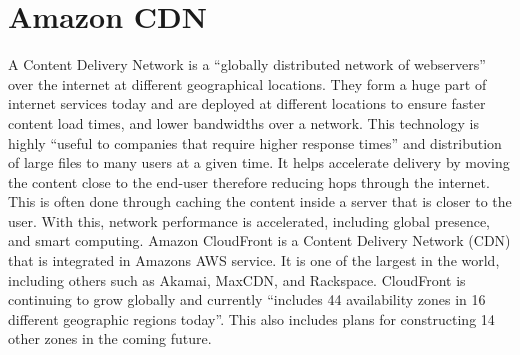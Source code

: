\section{Amazon CDN}

A Content Delivery Network is a “globally distributed network of webservers” \cite{Content-Delivery-Network} over the internet at different geographical locations. They form a huge part of internet services today and are deployed at different locations to ensure faster content load times, and lower bandwidths over a network. This technology is highly “useful to companies that require higher response times”\cite{Amazon-CloudFront} and distribution of large files to many users at a given time. It helps accelerate delivery by moving the content close to the end-user therefore reducing hops through the internet. This is often done through caching the content inside a server that is closer to the user. With this, network performance is accelerated, including global presence, and smart computing. Amazon CloudFront is a Content Delivery Network (CDN) that is integrated in Amazons AWS service. It is one of the largest in the world, including others such as Akamai, MaxCDN, and Rackspace. CloudFront is continuing to grow globally and currently “includes 44 availability zones in 16 different geographic regions today”\cite{Amazon-CloudFront}. This also includes plans for constructing 14 other zones in the coming future.

